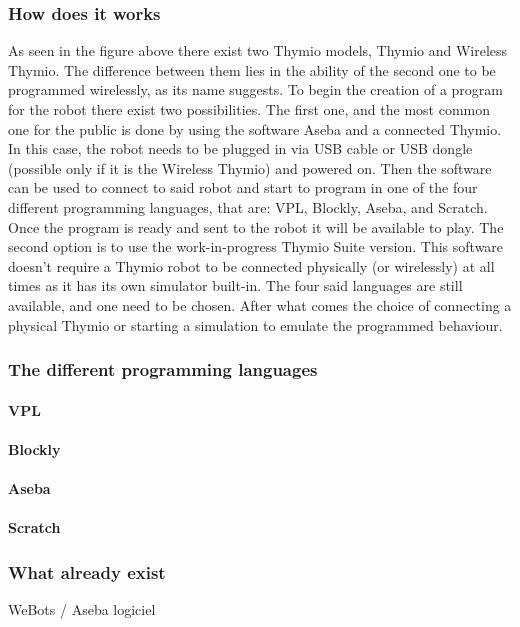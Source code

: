 \documentclass{scrartcl}
\begin{document}
\subsubsection{How does it works}

As seen in the figure above there exist two Thymio models, Thymio and Wireless Thymio. The difference between them lies in the ability of the second one to be programmed wirelessly, as its name suggests. To begin the creation of a program for the robot there exist two possibilities.
The first one, and the most common one for the public is done by using the software Aseba and a connected Thymio. In this case, the robot needs to be plugged in via USB cable or USB dongle (possible only if it is the Wireless Thymio) and powered on. Then the software can be used to connect to said robot and start to program in one of the four different programming languages, that are: VPL, Blockly, Aseba, and Scratch. Once the program is ready and sent to the robot it will be available to play.
The second option is to use the work-in-progress Thymio Suite version. This software doesn’t require a Thymio robot to be connected physically (or wirelessly) at all times as it has its own simulator built-in. The four said languages are still available, and one need to be chosen. After what comes the choice of connecting a physical Thymio or starting a simulation to emulate the programmed behaviour.

\subsubsection{The different programming languages}
\paragraph{VPL}
\paragraph{Blockly}
\paragraph{Aseba}
\paragraph{Scratch}
\subsubsection{What already exist} 
WeBots / Aseba logiciel
\end{document}

